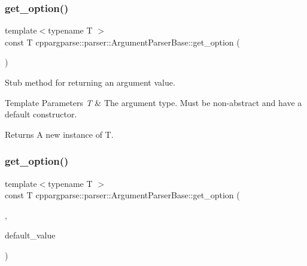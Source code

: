\subsubsection{\texorpdfstring{get\+\_\+option()}{get\_option()}\hspace{0.1cm}{\footnotesize\ttfamily [1/2]}}
{\footnotesize\ttfamily template$<$typename T $>$ \\
const T cppargparse\+::parser\+::\+Argument\+Parser\+Base\+::get\+\_\+option (\begin{DoxyParamCaption}\item[{const \hyperlink{structcppargparse_1_1types_1_1CommandLineArgument__t}{types\+::\+Command\+Line\+Argument\+\_\+t} \&}]{ }\end{DoxyParamCaption})\hspace{0.3cm}{\ttfamily [inline]}}



Stub method for returning an argument value. 


\begin{DoxyTemplParams}{Template Parameters}
{\em T} & The argument type. Must be non-\/abstract and have a default constructor.\\
\hline
\end{DoxyTemplParams}
\begin{DoxyReturn}{Returns}
A new instance of T. 
\end{DoxyReturn}
\mbox{\label{classcppargparse_1_1parser_1_1ArgumentParserBase_ae5f8dfec70ef927bc315e39046dcf63e}} 
\subsubsection{\texorpdfstring{get\+\_\+option()}{get\_option()}\hspace{0.1cm}{\footnotesize\ttfamily [2/2]}}
{\footnotesize\ttfamily template$<$typename T $>$ \\
const T cppargparse\+::parser\+::\+Argument\+Parser\+Base\+::get\+\_\+option (\begin{DoxyParamCaption}\item[{const \hyperlink{structcppargparse_1_1types_1_1CommandLineArgument__t}{types\+::\+Command\+Line\+Argument\+\_\+t} \&}]{,  }\item[{const T \&}]{default\+\_\+value }\end{DoxyParamCaption})\hspace{0.3cm}{\ttfamily [inline]}}



